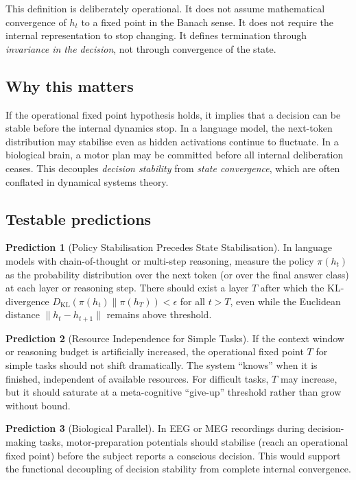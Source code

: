 \documentclass[11pt,a4paper]{article}
\theoremstyle{definition}
\newtheorem{prediction}{Prediction}
\begin{document}
This definition is deliberately operational. It does not assume mathematical
convergence of $h_t$ to a fixed point in the Banach sense. It does not require
the internal representation to stop changing. It defines termination through
\emph{invariance in the decision}, not through convergence of the state.

\subsection{Why this matters}

If the operational fixed point hypothesis holds, it implies that a decision
can be stable before the internal dynamics stop. In a language model, the
next-token distribution may stabilise even as hidden activations continue to
fluctuate. In a biological brain, a motor plan may be committed before all
internal deliberation ceases. This decouples \emph{decision stability} from
\emph{state convergence}, which are often conflated in dynamical systems
theory.

\subsection{Testable predictions}

\begin{prediction}[Policy Stabilisation Precedes State Stabilisation]
In language models with chain-of-thought or multi-step reasoning, measure the
policy $\pi(h_t)$ as the probability distribution over the next token (or over
the final answer class) at each layer or reasoning step. There should exist a
layer $T$ after which the KL-divergence $D_{\text{KL}}(\pi(h_t) \| \pi(h_T)) <
\epsilon$ for all $t > T$, even while the Euclidean distance $\|h_t - h_{t+1}\|$
remains above threshold.
\end{prediction}

\begin{prediction}[Resource Independence for Simple Tasks]
If the context window or reasoning budget is artificially increased, the
operational fixed point $T$ for simple tasks should not shift dramatically.
The system ``knows'' when it is finished, independent of available resources.
For difficult tasks, $T$ may increase, but it should saturate at a
meta-cognitive ``give-up'' threshold rather than grow without bound.
\end{prediction}

\begin{prediction}[Biological Parallel]
In EEG or MEG recordings during decision-making tasks, motor-preparation
potentials should stabilise (reach an operational fixed point) before the
subject reports a conscious decision. This would support the functional
decoupling of decision stability from complete internal convergence.
\end{prediction}
\end{document}
